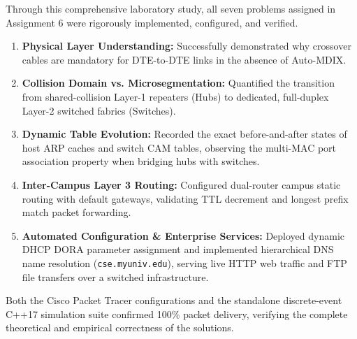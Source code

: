 \documentclass[12pt, a4paper]{article}
\begin{document}
Through this comprehensive laboratory study, all seven problems assigned in Assignment 6 were rigorously implemented, configured, and verified. 
\begin{enumerate}
    \item \textbf{Physical Layer Understanding:} Successfully demonstrated why crossover cables are mandatory for DTE-to-DTE links in the absence of Auto-MDIX.
    \item \textbf{Collision Domain vs. Microsegmentation:} Quantified the transition from shared-collision Layer-1 repeaters (Hubs) to dedicated, full-duplex Layer-2 switched fabrics (Switches).
    \item \textbf{Dynamic Table Evolution:} Recorded the exact before-and-after states of host ARP caches and switch CAM tables, observing the multi-MAC port association property when bridging hubs with switches.
    \item \textbf{Inter-Campus Layer 3 Routing:} Configured dual-router campus static routing with default gateways, validating TTL decrement and longest prefix match packet forwarding.
    \item \textbf{Automated Configuration \& Enterprise Services:} Deployed dynamic DHCP DORA parameter assignment and implemented hierarchical DNS name resolution (\texttt{cse.myuniv.edu}), serving live HTTP web traffic and FTP file transfers over a switched infrastructure.
\end{enumerate}
Both the Cisco Packet Tracer configurations and the standalone discrete-event C++17 simulation suite confirmed 100\% packet delivery, verifying the complete theoretical and empirical correctness of the solutions.
\end{document}
